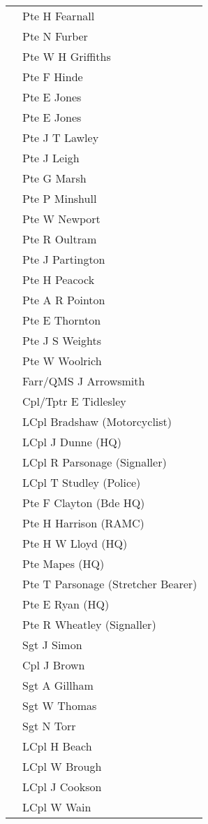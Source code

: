 \begin{center}
\begin{tabular}{rl}
    & Pte H Fearnall \\
    & Pte N Furber \\
    & Pte W H Griffiths \\
    & Pte F Hinde \\
    & Pte E Jones \\
    & Pte E Jones \\
    & Pte J T Lawley \\
    & Pte J Leigh \\
    & Pte G Marsh \\
    & Pte P Minshull \\
    & Pte W Newport \\
    & Pte R Oultram \\
    & Pte J Partington \\
    & Pte H Peacock \\
    & Pte A R Pointon \\
    & Pte E Thornton \\
    & Pte J S Weights \\
    & Pte W Woolrich \\
    & Farr/QMS J Arrowsmith \\
    & Cpl/Tptr E Tidlesley \\
    & LCpl Bradshaw (Motorcyclist) \\
    & LCpl J Dunne (HQ) \\
    & LCpl R Parsonage (Signaller) \\
    & LCpl T Studley (Police) \\
    & Pte F Clayton (Bde HQ) \\
    & Pte H Harrison (RAMC) \\
    & Pte H W Lloyd (HQ) \\
    & Pte Mapes (HQ) \\
    & Pte T Parsonage (Stretcher Bearer) \\
    & Pte E Ryan (HQ) \\
    & Pte R Wheatley (Signaller) \\
    & Sgt J Simon \\
    & Cpl J Brown \\
    & Sgt A Gillham \\
    & Sgt W Thomas \\
    & Sgt N Torr \\
    & LCpl H Beach \\
    & LCpl W Brough \\
    & LCpl J Cookson \\
    & LCpl W Wain \\

\end{tabular}
\end{center}
